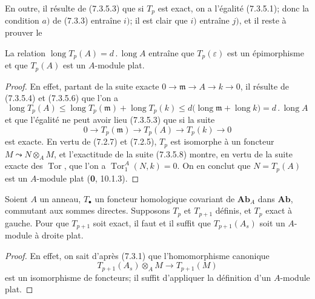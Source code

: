 En outre, il résulte de (7.3.5.3) que si $T_p$ est exact, on a l'égalité
(7.3.5.1); donc la condition $a)$ de (7.3.3) entraîne $i)$; il est clair que
$i)$ entraîne $j)$, et il reste à prouver le

\begin{lemma}[7.3.5.7]
La relation
$\operatorname{long}T_p(A)=d\mathbin{.}\operatorname{long}A$
entraîne que $T_p(\varepsilon)$ est un épimorphisme et que $T_p(A)$ est un
$A$-module plat.
\end{lemma}

\begin{proof}
En effet, partant de la suite exacte
$0\longrightarrow\mathfrak m\longrightarrow A\longrightarrow k\longrightarrow0$,
il résulte de (7.3.5.4) et (7.3.5.6) que l'on a
\[
  \operatorname{long}T_p(A)
  \leq
  \operatorname{long}T_p(\mathfrak m)+\operatorname{long}T_p(k)
  \leq
  d\bigl(\operatorname{long}\mathfrak m+\operatorname{long}k\bigr)
  =d\mathbin{.}\operatorname{long}A
\]
et que l'égalité ne peut avoir lieu (7.3.5.3) que si la suite
\[
  0\longrightarrow T_p(\mathfrak m)\longrightarrow T_p(A)
  \longrightarrow T_p(k)\longrightarrow0
  \tag{7.3.5.8}\label{III.7.3.5.8.fr}
\]
est exacte. En vertu de (7.2.7) et (7.2.5), $T_p$ est isomorphe à un foncteur
$M\leadsto N\otimes_A M$, et l'exactitude de la suite (7.3.5.8) montre, en vertu
de la suite exacte des $\operatorname{Tor}$, que l'on a
$\operatorname{Tor}_1^A(N,k)=0$. On en conclut que $N=T_p(A)$ est un
$A$-module plat (\textbf{0}, 10.1.3).
\end{proof}

\begin{lemma}[7.3.6]
Soient $A$ un anneau, $T_\bullet$ un foncteur homologique covariant de
$\boldsymbol{Ab}_A$ dans $\boldsymbol{Ab}$, commutant aux sommes directes. Supposons
$T_p$ et $T_{p+1}$ définis, et $T_p$ exact à gauche. Pour que $T_{p+1}$ soit
exact, il faut et il suffit que $T_{p+1}(A_s)$ soit un $A$-module à droite
plat.
\end{lemma}

\begin{proof}
En effet, on sait d'après (7.3.1) que l'homomorphisme canonique
\[
  T_{p+1}(A_s)\otimes_A M\longrightarrow T_{p+1}(M)
\]
est un isomorphisme de foncteurs; il suffit d'appliquer la définition d'un
$A$-module plat.
\end{proof}

